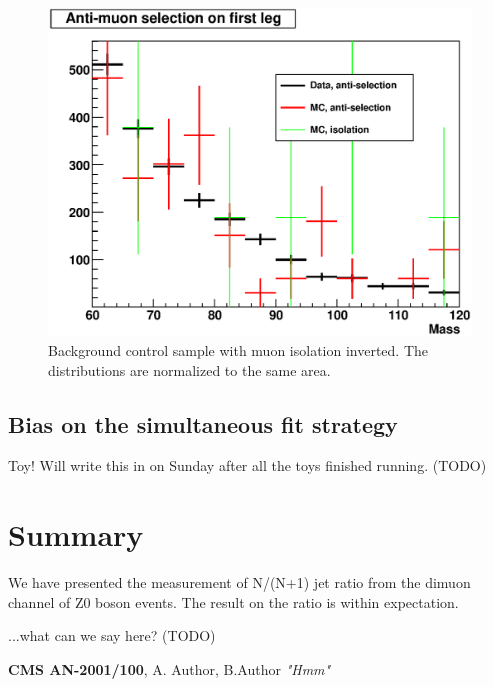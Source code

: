 \documentclass{cmspaper}
\begin{document}
\begin{figure}[hbtp]
\begin{center}
\includegraphics[width=150mm]{SingleLegAntiMuon}
\caption{Background control sample with muon isolation inverted.  The distributions are normalized to the same area.}
\label{Figure_AntiMuonSingleLeg}
\end{center}
\end{figure}

\subsection{Bias on the simultaneous fit strategy}

Toy!  Will write this in on Sunday after all the toys finished running.  (TODO)

\section{Summary}

We have presented the measurement of N/(N+1) jet ratio from the dimuon channel of Z0 boson events.
The result on the ratio is within expectation.

...what can we say here?  (TODO)


\begin{thebibliography}{9}
    {\bf CMS AN-2001/100},
      A. Author, B.Author
      {\em "Hmm"}
\end{thebibliography}
 
\pagebreak
\end{document}
